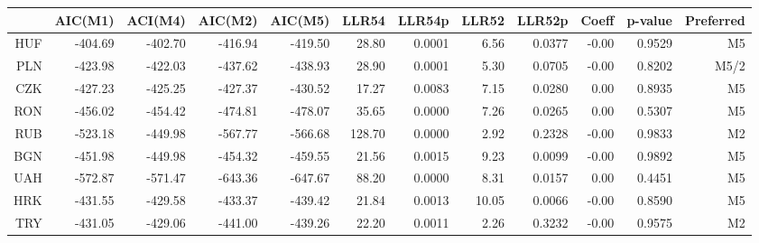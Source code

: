 \documentclass[12pt, a4paper, oneside]{article}\usepackage[]{graphicx}\usepackage[]{color}
\begin{document}
\begin{sidewaystable}[p]
\begin{threeparttable}
\centering
\begin{tabular}{rrrrrrrrrrrr}
  \hline
 & AIC(M1) & ACI(M4) & AIC(M2) & AIC(M5) & LLR54 & LLR54p & LLR52 & LLR52p & Coeff & p-value & Preferred\\ 
  \hline
HUF & -404.69 & -402.70 & -416.94 & -419.50 & 28.80 & 0.0001 & 6.56 & 0.0377 & -0.00 & 0.9529 & M5\\ 
  PLN & -423.98 & -422.03 & -437.62 & -438.93 & 28.90 & 0.0001 & 5.30 & 0.0705 & -0.00 & 0.8202 & M5/2\\ 
  CZK & -427.23 & -425.25 & -427.37 & -430.52 & 17.27 & 0.0083 & 7.15 & 0.0280 & 0.00 & 0.8935 & M5\\ 
  RON & -456.02 & -454.42 & -474.81 & -478.07 & 35.65 & 0.0000 & 7.26 & 0.0265 & 0.00 & 0.5307 & M5\\ 
  RUB & -523.18 & -449.98 & -567.77 & -566.68 & 128.70 & 0.0000 & 2.92 & 0.2328 & -0.00 & 0.9833 & M2\\ 
  BGN & -451.98 & -449.98 & -454.32 & -459.55 & 21.56 & 0.0015 & 9.23 & 0.0099 & -0.00 & 0.9892 & M5\\ 
  UAH & -572.87 & -571.47 & -643.36 & -647.67 & 88.20 & 0.0000 & 8.31 & 0.0157 & 0.00 & 0.4451 & M5\\ 
  HRK & -431.55 & -429.58 & -433.37 & -439.42 & 21.84 & 0.0013 & 10.05 & 0.0066 & -0.00 & 0.8590 & M5\\ 
  TRY & -431.05 & -429.06 & -441.00 & -439.26 & 22.20 & 0.0011 & 2.26 & 0.3232 & -0.00 & 0.9575 & M2\\ 
   \hline
\end{tabular}
\begin{tablenotes}
\small

\end{tablenotes}
\end{threeparttable}
\end{sidewaystable}
\end{document}

